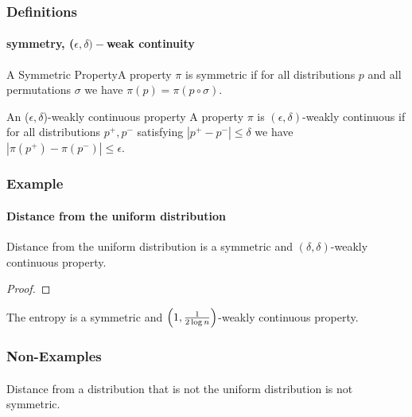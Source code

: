\documentclass{beamer}
\begin{document}
\begin{frame}
  \frametitle{Definitions}
  \framesubtitle{ symmetry, ($\epsilon,\delta)-$weak continuity}

  \begin{block}{A Symmetric Property}A property $\pi$ is symmetric if
    for all distributions $p$ and all permutations $\sigma$ we have
    $\pi(p)=\pi(p\circ\sigma)$.
  \end{block}

  \begin{block}{An ($\epsilon, \delta$)-weakly continuous property}
    A property $\pi$ is $(\epsilon,\delta)$-weakly continuous if for
    all distributions $p^+,p^-$ satisfying $|p^+-p^-|\le\delta$ we
    have $|\pi(p^+)-\pi(p^-)|\le \epsilon$.
  \end{block}

\end{frame}

\begin{frame}
  \frametitle{Example} \framesubtitle{Distance from the uniform
    distribution}
  \begin{theorem}
    Distance from the uniform distribution is a symmetric and
    $(\delta, \delta)$-weakly continuous property.
  \end{theorem}
  \begin{proof}
    
  \end{proof}
  \begin{theorem}
    The entropy is a symmetric and $\left(1,{1\over 2\log
        n}\right)$-weakly continuous property.
  \end{theorem}
\end{frame}


\begin{frame}
  \frametitle{Non-Examples} \framesubtitle{}
  \begin{block}{}
    Distance from a distribution that is not the uniform distribution
    is not symmetric.
  \end{block}
\end{frame}
\end{document}

